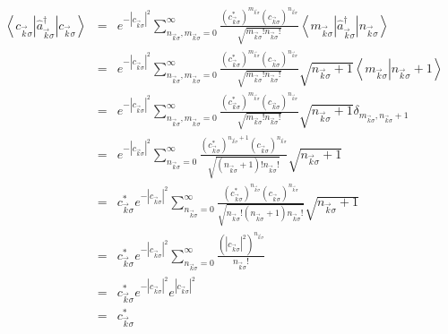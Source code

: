 \begin{eqnarray}
\left\langle c_{\vec{k}\sigma}\right| \hat{a}_{\vec{k}\sigma}^{\dagger
}\left| c_{\vec{k}\sigma}\right> & = &e^{-\left| c_{\vec{k}%
\sigma}\right| ^{2}}\sum_{n_{\vec{k}\sigma},m_{\vec{k}\sigma}=0}^{\infty
}\frac{\left( c_{\vec{k}\sigma}^{\ast}\right) ^{m_{\vec{k}\sigma}}\left(
c_{\vec{k}\sigma}\right) ^{n_{\vec{k}\sigma}}}{\sqrt{m_{\vec{k}\sigma
}!n_{\vec{k}\sigma}!}}\left\langle m_{\vec{k}\sigma}\right| \hat{a}%
_{\vec{k}\sigma}^{\dagger}\left| n_{\vec{k}\sigma}\right> \\
& = &e^{-\left| c_{\vec{k}\sigma}\right| ^{2}}\sum_{n_{\vec{k}\sigma
},m_{\vec{k}\sigma}=0}^{\infty}\frac{\left( c_{\vec{k}\sigma}^{\ast}\right)
^{m_{\vec{k}\sigma}}\left( c_{\vec{k}\sigma}\right) ^{n_{\vec{k}\sigma}}%
}{\sqrt{m_{\vec{k}\sigma}!n_{\vec{k}\sigma}!}}\sqrt{n_{\vec{k}\sigma}%
+1}\left\langle m_{\vec{k}\sigma}\right| \left. n_{\vec{k}\sigma
}+1\right> \\
& = &e^{-\left| c_{\vec{k}\sigma}\right| ^{2}}\sum_{n_{\vec{k}\sigma
},m_{\vec{k}\sigma}=0}^{\infty}\frac{\left( c_{\vec{k}\sigma}^{\ast}\right)
^{m_{\vec{k}\sigma}}\left( c_{\vec{k}\sigma}\right) ^{n_{\vec{k}\sigma}}%
}{\sqrt{m_{\vec{k}\sigma}!n_{\vec{k}\sigma}!}}\sqrt{n_{\vec{k}\sigma}+1}%
\delta_{m_{\vec{k}\sigma},n_{\vec{k}\sigma}+1}\\
& = &e^{-\left| c_{\vec{k}\sigma}\right| ^{2}}\sum_{n_{\vec{k}\sigma}%
=0}^{\infty}\frac{\left( c_{\vec{k}\sigma}^{\ast}\right) ^{n_{\vec{k}\sigma
}+1}\left( c_{\vec{k}\sigma}\right) ^{n_{\vec{k}\sigma}}}{\sqrt{\left(
n_{\vec{k}\sigma}+1\right) !n_{\vec{k}\sigma}!}}\sqrt{n_{\vec{k}\sigma}+1}\\
& = &c_{\vec{k}\sigma}^{\ast}e^{-\left| c_{\vec{k}\sigma}\right| ^{2}%
}\sum_{n_{\vec{k}\sigma}=0}^{\infty}\frac{\left( c_{\vec{k}\sigma}^{\ast
}\right) ^{n_{\vec{k}\sigma}}\left( c_{\vec{k}\sigma}\right) ^{n_{\vec
{k}\sigma}}}{\sqrt{n_{\vec{k}\sigma}!\left( n_{\vec{k}\sigma}+1\right)
n_{\vec{k}\sigma}!}}\sqrt{n_{\vec{k}\sigma}+1}\\
& = &c_{\vec{k}\sigma}^{\ast}e^{-\left| c_{\vec{k}\sigma}\right| ^{2}%
}\sum_{n_{\vec{k}\sigma}=0}^{\infty}\frac{\left( \left| c_{\vec{k}\sigma
}\right| ^{2}\right) ^{n_{\vec{k}\sigma}}}{n_{\vec{k}\sigma}!}\\
& = &c_{\vec{k}\sigma}^{\ast}e^{-\left| c_{\vec{k}\sigma}\right| ^{2}%
}e^{\left| c_{\vec{k}\sigma}\right| ^{2}}\\
& = &c_{\vec{k}\sigma}^{\ast}%
\end{eqnarray}


